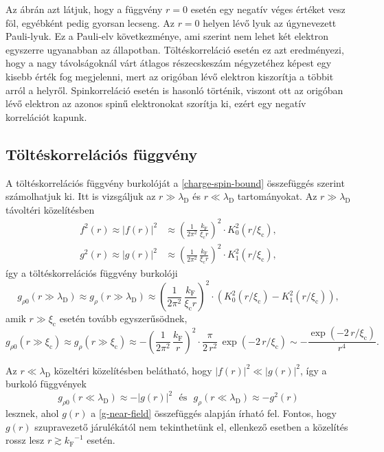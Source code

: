 \documentclass[a4paper,12pt,titlepage]{article}
\newcommand{\kF}{{k_\text{F}}}
\begin{document}
Az ábrán azt látjuk, hogy a függvény $r = 0$ esetén egy negatív véges értéket vesz föl, egyébként pedig gyorsan lecseng.  Az $r = 0$ helyen lévő lyuk az úgynevezett Pauli-lyuk.  Ez a Pauli-elv következménye, ami szerint nem lehet két elektron egyszerre ugyanabban az állapotban.  Töltéskorreláció esetén ez azt eredményezi, hogy a nagy távolságoknál várt átlagos részecskeszám négyzetéhez képest egy kisebb érték fog megjelenni, mert az origóban lévő elektron kiszorítja a többit arról a helyről.  Spinkorreláció esetén is hasonló történik, viszont ott az origóban lévő elektron az azonos spinű elektronokat szorítja ki, ezért egy negatív korrelációt kapunk.


\subsection{Töltéskorrelációs függvény}

A töltéskorrelációs függvény burkolóját a \eqref{charge-spin-bound} összefüggés szerint számolhatjuk ki.  Itt is vizsgáljuk az $r \gg \lambda_\text{D}$ és $r \ll \lambda_\text{D}$ tartományokat.  Az $r \gg \lambda_\text{D}$ távoltéri közelítésben
\begin{equation} \label{f2-g2-far}
\begin{split}
	f^2(r) \approx \left| f(r) \right|^2 & \approx \left( \frac{1}{2 \pi^2} \, \frac{\kF}{\xi_\text{c} r} \right)^2 \cdot K_0^2(r / \xi_\text{c}), \\
	g^2(r) \approx \left| g(r) \right|^2 & \approx \left( \frac{1}{2 \pi^2} \, \frac{\kF}{\xi_\text{c} r} \right)^2 \cdot K_1^2(r / \xi_\text{c}),
\end{split}
\end{equation}
így a töltéskorrelációs függvény burkolóji
\begin{equation}
	g_{\rho 0}(r \gg \lambda_\text{D}) \approx g_\rho(r \gg \lambda_\text{D}) \approx \left( \frac{1}{2 \pi^2} \, \frac{\kF}{\xi_\text{c} r} \right)^2 \cdot \left( K_0^2(r / \xi_\text{c}) - K_1^2(r / \xi_\text{c}) \right),
\end{equation}
amik $r \gg \xi_\text{c}$ esetén tovább egyszerűsödnek,
\begin{equation}
	g_{\rho 0}(r \gg \xi_\text{c}) \approx g_\rho(r \gg \xi_\text{c}) \approx -\left( \frac{1}{2 \pi^2} \, \frac{\kF}{r} \right)^2 \cdot \frac{\pi}{2 \, r^2} \, \exp(-2 \, r / \xi_\text{c}) \sim -\frac{\exp(-2 \, r / \xi_\text{c})}{r^4}.
\end{equation}

Az $r \ll \lambda_\text{D}$ közeltéri közelítésben belátható, hogy $\left| f(r) \right|^2 \ll \left| g(r) \right|^2$, így a burkoló függvények
\begin{equation}
	g_{\rho 0}(r \ll \lambda_\text{D}) \approx -\left| g(r) \right|^2 ~~~ \text{és} ~~~ g_\rho(r \ll \lambda_\text{D}) \approx -g^2(r)
\end{equation}
lesznek, ahol $g(r)$ a \eqref{g-near-field} összefüggés alapján írható fel.  Fontos, hogy $g(r)$ szupravezető járulékától nem tekinthetünk el, ellenkező esetben a közelítés rossz lesz $r \gtrsim \kF^{-1}$ esetén.
\end{document}

